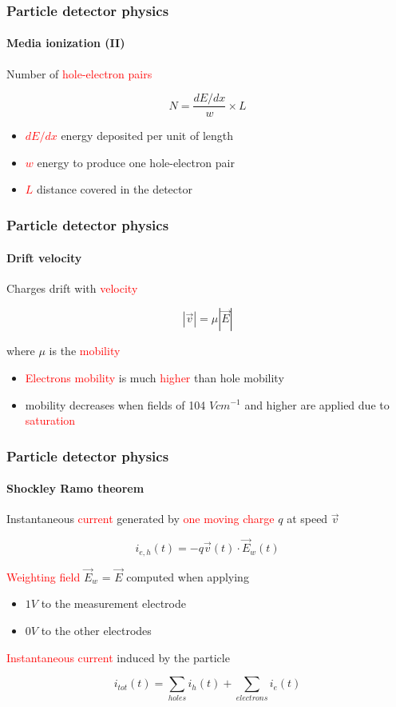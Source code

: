 \documentclass[14pt]{beamer}
\begin{document}
\begin{frame}
  \frametitle{Particle detector physics}
  \framesubtitle{Media ionization (II)}

  Number of \textcolor{red}{hole-electron pairs}

  \[N = \frac{dE/dx}{w} \times L\]

\begin{itemize}
  \item \textcolor{red}{$dE/dx$} energy deposited per unit of length
  \item \textcolor{red}{$w$} energy to produce one hole-electron pair
  \item \textcolor{red}{$L$} distance covered in the detector
\end{itemize}

\end{frame}

\begin{frame}
  \frametitle{Particle detector physics}
  \framesubtitle{Drift velocity}

  Charges drift with \textcolor{red}{velocity}

  \[|\vec{v}| = \mu |\vec{E}|\]

  where  $\mu$ is the \textcolor{red}{mobility}

  \begin{itemize}
    \item \textcolor{red}{Electrons mobility} is much \textcolor{red}{higher} than hole mobility
    \item mobility decreases when fields of 104 $V cm^{-1}$ and higher are
    applied due to \textcolor{red}{saturation}

  \end{itemize}
\end{frame}

\begin{frame}
  \frametitle{Particle detector physics}
  \framesubtitle{Shockley Ramo theorem}

   Instantaneous \textcolor{red}{current} generated	by \textcolor{red}{one moving charge} $q$ at speed $\vec{v}$

		\[i_{e,h}(t) = -q \vec{v}(t) \cdot \vec{E}_w(t)\]

	\textcolor{red}{Weighting field} $\vec{E}_w$ = $\vec{E}$ computed when applying

\begin{itemize}
  \item $1V$ to the measurement electrode
	\item $0V$ to the other electrodes
\end{itemize}

\textcolor{red}{Instantaneous current} induced by the particle

\[i_{tot}(t) = \sum_{holes} i_h(t) + \sum_{electrons} i_e(t)\]
\end{frame}
\end{document}
